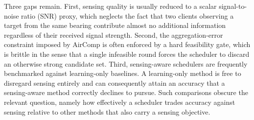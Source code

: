 \documentclass[lettersize,journal]{IEEEtran}
\begin{document}
Three gaps remain. First, sensing quality is usually reduced to a scalar signal-to-noise ratio (SNR) proxy, which neglects the fact that two clients observing a target from the same bearing contribute almost no additional information regardless of their received signal strength. Second, the aggregation-error constraint imposed by AirComp is often enforced by a hard feasibility gate, which is brittle in the sense that a single infeasible round forces the scheduler to discard an otherwise strong candidate set. Third, sensing-aware schedulers are frequently benchmarked against learning-only baselines. A learning-only method is free to disregard sensing entirely and can consequently attain an accuracy that a sensing-aware method correctly declines to pursue. Such comparisons obscure the relevant question, namely how effectively a scheduler trades accuracy against sensing relative to other methods that also carry a sensing objective.
\end{document}
